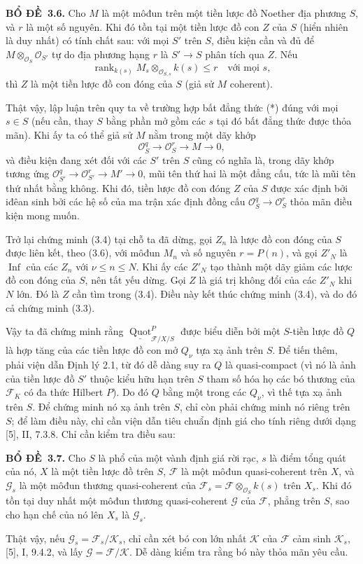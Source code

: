 \documentclass[11pt,twoside,openany]{book}
\numberwithin{equation}{section}
\newcommand{\src}[1]{%
  \phantomsection\hypertarget{src:\fgasourceid:#1}{}%
  \marginpar{\raggedleft\footnotesize\sffamily #1}%
}
\newcommand{\fgasourceid}{unset}
\newcommand{\result}[2]{\par\medskip\noindent\textbf{#1\if\relax\detokenize{#2}\relax\else\ #2\fi.}\quad}
\begin{document}
\result{BỔ ĐỀ}{3.6} Cho $M$ là một môđun trên một tiền lược đồ Noether địa
phương $S$, và $r$ là một số nguyên. Khi đó tồn tại một tiền lược đồ con $Z$
của $S$ (hiển nhiên là duy nhất) có tính chất sau: với mọi $S'$ trên $S$, điều
kiện cần và đủ để $M\otimes_{\mathcal O_S}\mathcal O_{S'}$ tự do địa phương
hạng $r$ là $S'\longrightarrow S$ phân tích qua $Z$. Nếu
\[
\operatorname{rank}_{k(s)}
M_s\otimes_{\mathcal O_{S,s}}k(s)\leq r
\quad\text{với mọi $s$},
\]
thì $Z$ là một tiền lược đồ con đóng của $S$ (giả sử $M$ coherent).
\src{264}
Thật vậy, lập luận trên quy ta về trường hợp bất đẳng thức (*) đúng với mọi
$s\in S$ (nếu cần, thay $S$ bằng phần mở gồm các $s$ tại đó bất đẳng thức
được thỏa mãn). Khi ấy ta có thể giả sử $M$ nằm trong một dãy khớp
\[
\mathcal O_S^q\longrightarrow\mathcal O_S^r\longrightarrow M\longrightarrow0,
\]
và điều kiện đang xét đối với các $S'$ trên $S$ cũng có nghĩa là, trong dãy
khớp tương ứng $\mathcal O_{S'}^q\longrightarrow\mathcal O_{S'}^r
\longrightarrow M'\longrightarrow0$, mũi tên thứ hai là một đẳng cấu, tức là
mũi tên thứ nhất bằng không. Khi đó, tiền lược đồ con đóng $Z$ của $S$ được
xác định bởi iđêan sinh bởi các hệ số của ma trận xác định đồng cấu
$\mathcal O_S^q\longrightarrow\mathcal O_S^r$ thỏa mãn điều kiện mong muốn.

Trở lại chứng minh (3.4) tại chỗ ta đã dừng, gọi $Z_n$ là lược đồ con đóng
của $S$ được liên kết, theo (3.6), với môđun $M_n$ và số nguyên $r=P(n)$, và
gọi $Z'_N$ là $\operatorname{Inf}$ của các $Z_n$ với
$\nu\leq n\leq N$. Khi ấy các $Z'_N$ tạo thành một dãy giảm các lược đồ con
đóng của $S$, nên tất yếu dừng. Gọi $Z$ là giá trị không đổi của các
$Z'_N$ khi $N$ lớn. Đó là $Z$ cần tìm trong (3.4). Điều này kết thúc chứng
minh (3.4), và do đó cả chứng minh (3.3).

Vậy ta đã chứng minh rằng
$\underline{\operatorname{Quot}}^P_{\mathcal F/X/S}$ được biểu diễn bởi một
$S$-tiền lược đồ $Q$ là hợp tăng của các tiền lược đồ con mở $Q_\nu$ tựa xạ
ảnh trên $S$. Để tiến thêm, phải viện dẫn Định lý 2.1, từ đó dễ dàng suy ra
$Q$ là quasi-compact (vì nó là ảnh của tiền lược đồ $S'$ thuộc kiểu hữu hạn
trên $S$ tham số hóa họ các bó thương của $\mathcal F_K$ có đa thức Hilbert
$P$). Do đó $Q$ bằng một trong các $Q_\nu$, vì thế tựa xạ ảnh trên $S$. Để
chứng minh nó xạ ảnh trên $S$, chỉ còn phải chứng minh nó riêng trên $S$; để
làm điều này, chỉ cần viện dẫn tiêu chuẩn định giá cho tính riêng dưới dạng
[5], II, 7.3.8. Chỉ cần kiểm tra điều sau:

\result{BỔ ĐỀ}{3.7} Cho $S$ là phổ của một vành định giá rời rạc, $s$ là điểm
tổng quát của nó, $X$ là một tiền lược đồ trên $S$, $\mathcal F$ là một môđun
quasi-coherent trên $X$, và $\mathcal G_s$ là một môđun thương quasi-coherent
của $\mathcal F_s=\mathcal F\otimes_{\mathcal O_S}k(s)$ trên $X_s$. Khi đó
tồn tại duy nhất một môđun thương quasi-coherent $\mathcal G$ của
$\mathcal F$, phẳng trên $S$, sao cho hạn chế của nó lên $X_s$ là
$\mathcal G_s$.
\src{265}
Thật vậy, nếu $\mathcal G_s=\mathcal F_s/\mathcal K_s$, chỉ cần xét bó con lớn
nhất $\mathcal K$ của $\mathcal F$ cảm sinh $\mathcal K_s$, [5], I, 9.4.2, và
lấy $\mathcal G=\mathcal F/\mathcal K$. Dễ dàng kiểm tra rằng bó này thỏa mãn
yêu cầu.
\end{document}
